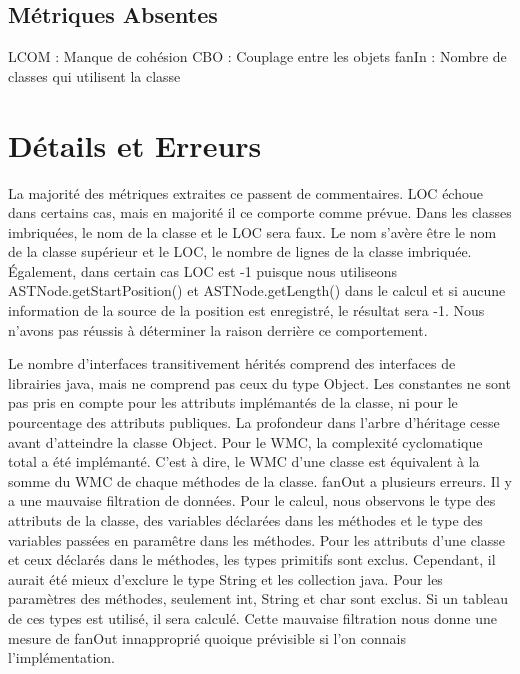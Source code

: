\documentclass[11pt, french]{article} %
\begin{document}
\subsection{Métriques Absentes}
LCOM : Manque de cohésion
\newline
CBO : Couplage entre les objets
\newline
fanIn : Nombre de classes qui utilisent la classe
\newline

\section{Détails et Erreurs}
La majorité des métriques extraites ce passent de commentaires. LOC échoue dans certains cas, mais en majorité il ce comporte comme prévue.
Dans les classes imbriquées, le nom de la classe et le LOC sera faux. Le nom s'avère être le nom de la classe supérieur et le LOC, le nombre de lignes de la classe imbriquée. Également, dans certain cas LOC est -1 puisque nous utiliseons  ASTNode.getStartPosition() et ASTNode.getLength() dans le calcul et si aucune information de la source de la position est enregistré, le résultat sera -1. Nous n'avons pas réussis à déterminer la raison derrière ce comportement.
\newline

Le nombre d'interfaces transitivement hérités comprend des interfaces de librairies java, mais ne comprend pas ceux du type Object.
\newline
 Les constantes ne sont pas pris en compte pour les attributs implémantés de la classe, ni pour le pourcentage des attributs publiques.
 \newline
 La profondeur dans l'arbre d'héritage cesse avant d'atteindre la classe Object.
 \newline
 Pour le WMC, la complexité cyclomatique total a été implémanté. C'est à dire, le WMC d'une classe est équivalent à la somme du WMC de chaque méthodes de la classe.
 \newline
 fanOut a plusieurs erreurs. Il y a une mauvaise filtration de données. Pour le calcul, nous observons le type des attributs de la classe, des variables déclarées dans les méthodes et le type des variables passées en paramêtre dans les méthodes. Pour les attributs d'une classe et ceux déclarés dans le méthodes, les types primitifs sont exclus. Cependant, il aurait été mieux d'exclure le type String et les collection java. Pour les paramètres des méthodes, seulement int, String et char sont exclus. Si un tableau de ces types est utilisé, il sera calculé. Cette mauvaise filtration nous donne une mesure de fanOut innapproprié quoique prévisible si l'on connais l'implémentation.
 \newline
\end{document}
